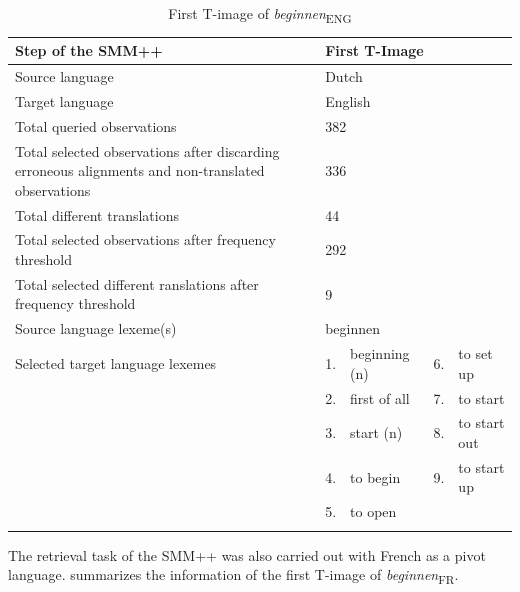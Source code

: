 \begin{table}
\caption{First T-image of \textit{beginnen}\textsubscript{ENG}\label{tab:3:6}}
\small
\begin{tabularx}{\textwidth}{>{\raggedright}p{}lXlX}
\lsptoprule
Step of the SMM++ & \multicolumn{4}{l}{First T-Image}\\ \midrule
\rowcolor{lsLightGray} Source language & \multicolumn{4}{l}{Dutch}\\
Target language & \multicolumn{4}{l}{English}\\
\rowcolor{lsLightGray} Total queried observations & \multicolumn{4}{l}{382}\\
Total selected observations after discarding erroneous alignments and non-translated observations &  \multicolumn{4}{l}{336}\\
\rowcolor{lsLightGray} Total different translations & \multicolumn{4}{l}{44}\\
Total selected observations after frequency threshold  & \multicolumn{4}{l}{292}\\
\rowcolor{lsLightGray} Total selected different ranslations after frequency threshold & \multicolumn{4}{l}{9}\\
Source language lexeme(s) & \multicolumn{4}{l}{beginnen}\\
\rowcolor{lsLightGray}Selected target language lexemes & 1. & beginning (n) & 6. & to set up \\
\rowcolor{lsLightGray}& 2. & first of all & 7. & to start \\
\rowcolor{lsLightGray}& 3. & start (n) & 8. & to start out \\
\rowcolor{lsLightGray}& 4. & to begin & 9. & to start up \\
\rowcolor{lsLightGray}& 5. & to open  &&\\
\lspbottomrule
\end{tabularx}
\end{table}

The retrieval task of the SMM++ was also carried out with French as a pivot language.  summarizes the information of the first T-image of \textit{beginnen}\textsubscript{FR}.

